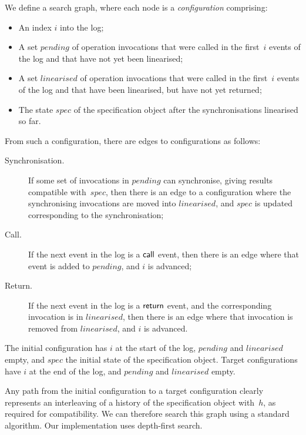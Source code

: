 We define a search graph, where each node is a \emph{configuration}
comprising:
%
\begin{itemize}
\item An index $i$ into the log;

\item A set $pending$ of operation invocations that were called in the
  first~$i$ events of the log and that have not yet been linearised;

\item A set $linearised$ of operation invocations that were called in the
  first~$i$ events of the log and that have been linearised, but have not yet
  returned;

\item The state $spec$ of the specification object after the synchronisations
  linearised so far.
\end{itemize}
%
From such a configuration, there are edges to configurations as follows:
%
\def\edgeFont#1{\rm\textsf{#1}}
\begin{description}
\item[\edgeFont{Synchronisation}.] If some set of invocations in $pending$ can
  synchronise, giving results compatible with~$spec$, then there is an edge to
  a configuration where the synchronising invocations are moved into
  $linearised$, and $spec$ is updated corresponding to the synchronisation;

\item[\edgeFont{Call}.] If the next event in the log is a $\mathsf{call}$ event, then
  there is an edge where that event is added to $pending$, and $i$ is
  advanced;

\item[\edgeFont{Return}.] If the next event in the log is a $\mathsf{return}$ event,
  and the corresponding invocation is in $linearised$, then there is an edge
  where that invocation is removed from $linearised$, and $i$ is advanced.
\end{description}
%
The initial configuration has $i$ at the start of the log, $pending$ and
$linearised$ empty, and $spec$ the initial state of the specification object.
Target configurations have $i$ at the end of the log, and $pending$ and
$linearised$ empty.

Any path from the initial configuration to a target configuration clearly
represents an interleaving of a history of the specification object with~$h$,
as required for compatibility.  We can therefore search this graph using a
standard algorithm.  Our implementation uses depth-first search.

